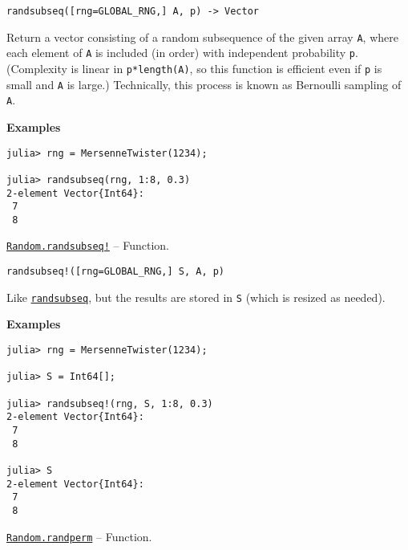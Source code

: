 \begin{adjustwidth}{2em}{0pt}


\begin{verbatim}
randsubseq([rng=GLOBAL_RNG,] A, p) -> Vector
\end{verbatim}

Return a vector consisting of a random subsequence of the given array \texttt{A}, where each element of \texttt{A} is included (in order) with independent probability \texttt{p}. (Complexity is linear in \texttt{p*length(A)}, so this function is efficient even if \texttt{p} is small and \texttt{A} is large.) Technically, this process is known as {\textquotedbl}Bernoulli sampling{\textquotedbl} of \texttt{A}.

\textbf{Examples}


\begin{verbatim}
julia> rng = MersenneTwister(1234);

julia> randsubseq(rng, 1:8, 0.3)
2-element Vector{Int64}:
 7
 8
\end{verbatim}



\end{adjustwidth}
\hypertarget{16120735695998231549}{}
\hyperlink{16120735695998231549}{\texttt{Random.randsubseq!}}  -- {Function.}

\begin{adjustwidth}{2em}{0pt}


\begin{verbatim}
randsubseq!([rng=GLOBAL_RNG,] S, A, p)
\end{verbatim}

Like \hyperlink{10454370655022505544}{\texttt{randsubseq}}, but the results are stored in \texttt{S} (which is resized as needed).

\textbf{Examples}


\begin{verbatim}
julia> rng = MersenneTwister(1234);

julia> S = Int64[];

julia> randsubseq!(rng, S, 1:8, 0.3)
2-element Vector{Int64}:
 7
 8

julia> S
2-element Vector{Int64}:
 7
 8
\end{verbatim}



\end{adjustwidth}
\hypertarget{7342203624124611352}{}
\hyperlink{7342203624124611352}{\texttt{Random.randperm}}  -- {Function.}

